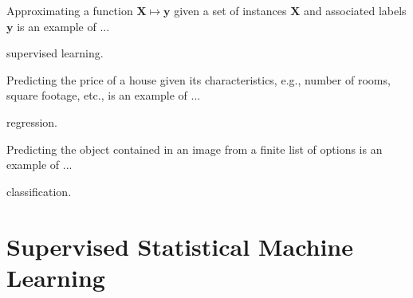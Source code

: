 \begin{questions}
\question Approximating a function $\bm{X} \mapsto \bm{y}$ given a set of instances $\bm{X}$ and associated labels $\bm{y}$ is an example of ...



\begin{solution}[.5in]
supervised learning.
\end{solution}


\question Predicting the price of a house given its characteristics, e.g., number of rooms, square footage, etc., is an example of ...

\begin{solution}[.5in]
regression.
\end{solution}


\question Predicting the object contained in an image from a finite list of options is an example of ...

\begin{solution}[.5in]
classification.
\end{solution}

\end{questions}

\section{Supervised Statistical Machine Learning}

